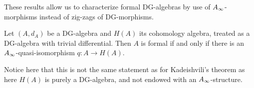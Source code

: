 These results allow us to characterize formal DG-algebras by use of $A_{\infty}$-morphisms instead of zig-zags of DG-morphisms. 


\begin{corollary}\label{cor:formal}
Let $(A, d_A)$ be a DG-algebra and $H(A)$ its cohomology algebra, treated as a DG-algebra with trivial differential. Then $A$ is formal if and only if there is an $A_{\infty}$-quasi-isomorphism $q:A\rightarrow H(A)$. 
\end{corollary}

Notice here that this is not the same statement as for Kadeishvili's theorem as here $H(A)$ is purely a DG-algebra, and not endowed with an $A_{\infty}$-structure. 
